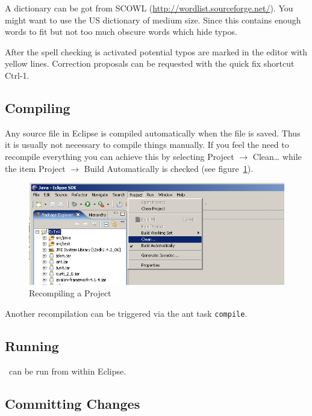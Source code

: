 \documentclass{extex-doc}
\newcommand\menu{\textsf}
\newcommand\sub{\(\rightarrow\) }
\begin{document}
A dictionary can be got from SCOWL
(\url{http://wordlist.sourceforge.net/}). You might want to use the US
dictionary of medium size. Since this contains enough words to fit but
not too much obscure words which hide typos.

After the spell checking is activated potential typos are marked in
the editor with yellow lines. Correction proposals can be requested
with the quick fix shortcut Ctrl-1.


\subsection{Compiling \ExTeX}

Any source file in Eclipse is compiled automatically when the file is
saved. Thus it is usually not necessary to compile things manually.
If you feel the need to recompile everything you can achieve this by
selecting \menu{Project \sub Clean\ldots} while the item \menu{Project
\sub Build Automatically} is checked (see figure~\ref{fig:eclipse-recompile}).
\begin{figure}[th]
  \centering
  \includegraphics[scale=.4]{image/eclipse-recompile}
  \caption{Recompiling a Project}\label{fig:eclipse-recompile}
\end{figure}

Another recompilation can be triggered via the ant task \texttt{compile}.

\subsection{Running \ExTeX}

\ExTeX\ can be run from within Eclipse.

\INCOMPLETE

\subsection{Committing Changes}

\INCOMPLETE
\end{document}
